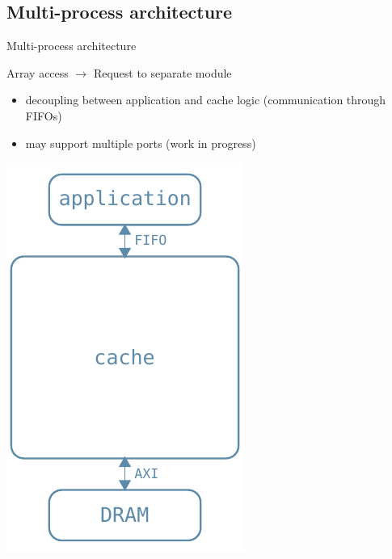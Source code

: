 \documentclass[handout]{beamer}
\begin{document}
\subsection{Multi-process architecture}
\begin{frame}{Multi-process architecture}
	\begin{minipage}{.7\textwidth}
		\begin{center}
			Array access $\rightarrow$ Request to separate module
		\end{center}
		\begin{itemize}
			\item decoupling between application and cache logic
				(communication through FIFOs)
			\item may support multiple ports (work in progress)
		\end{itemize}
	\end{minipage}
	\begin{minipage}{.28\textwidth}
		\begin{center}
			\includegraphics[width=.9\textwidth]{complete_arch.pdf}
		\end{center}
	\end{minipage}
\end{frame}
\end{document}
